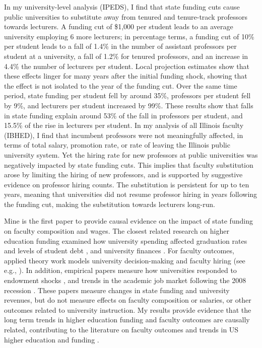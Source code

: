 In my university-level analysis (IPEDS), I find that state funding cuts cause public universities to substitute away from tenured and tenure-track professors towards lecturers.
A funding cut of \$1,000 per student leads to an average university employing 6 more lecturers;
in percentage terms, a funding cut of 10\% per student leads to a fall of 1.4\% in the number of assistant professors per student at a university, a fall of 1.2\% for tenured professors, and an increase in 4.4\% the number of lecturers per student.
Local projection estimates show that these effects linger for many years after the initial funding shock, showing that the effect is not isolated to the year of the funding cut. 
Over the same time period, state funding per student fell by around 35\%, professors per student fell by 9\%, and lecturers per student increased by 99\%.
These results show that falls in state funding explain around 53\% of the fall in professors per student,
and 15.5\% of the rise in lecturers per student.
In my analysis of all Illinois faculty (IBHED), I find that incumbent professors were not meaningfully affected, in terms of total salary, promotion rate, or rate of leaving the Illinois public university system.
Yet the hiring rate for new professors at public universities was negatively impacted by state funding cuts.
This implies that faculty substitution arose by limiting the hiring of new professors, and is supported by suggestive evidence on professor hiring counts.
The substitution is persistent for up to ten years, meaning that universities did not resume professor hiring in years following the funding cut, making the substitution towards lecturers long-run.

Mine is the first paper to provide causal evidence on the impact of state funding on faculty composition and wages.
The closest related research on higher education funding examined how university spending affected graduation rates and levels of student debt \citep{NBERw23736,NBERw27885}, and university finances \citep{miller2022making,bound2019public,brown2014endowment}.
For faculty outcomes, applied theory work models university decision-making and faculty hiring (see e.g., \citealt{abe2015implications,johnson2009jep,NBERc13879}).
In addition, empirical papers measure how universities responded to endowment shocks \citep{brown2014endowment}, and trends in the academic job market following the 2008 recession \citep{turner2014impact}.
These papers measure changes in state funding and university revenues, but do not measure effects on faculty composition or salaries, or other outcomes related to university instruction.
My results provide evidence that the long term trends in higher education funding and faculty outcomes are causally related, contributing to the literature on faculty outcomes \citep{ehrenberg2003studying} and trends in US higher education and funding \citep{hoxby2009changing,ehrenberg2012american}.

